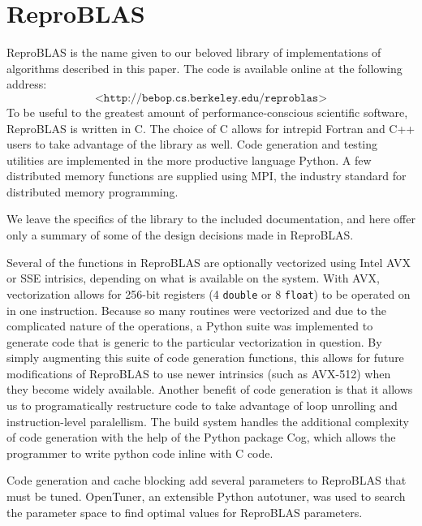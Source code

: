 \section{ReproBLAS}
  \label{sec:reproBLAS}
  ReproBLAS is the name given to our beloved library of implementations of algorithms described in this paper.
  The code is available online at the following address:
  \[
  \texttt{<http://bebop.cs.berkeley.edu/reproblas>}
  \]
  To be useful to the greatest amount of performance-conscious scientific software, ReproBLAS is written in C.
  The choice of C allows for intrepid Fortran and C++ users to take advantage of the library as well.
  Code generation and testing utilities are implemented in the more productive language Python.
  A few distributed memory functions are supplied using MPI, the industry standard for distributed memory programming.

  We leave the specifics of the library to the included documentation, and here offer only a summary of some of the design decisions made in ReproBLAS.

  Several of the functions in ReproBLAS are optionally vectorized using Intel AVX or SSE intrisics, depending on what is available on the system. With AVX, vectorization allows for 256-bit registers (4 \texttt{double} or 8 \texttt{float}) to be operated on in one instruction. Because so many routines were vectorized and due to the complicated nature of the operations, a Python suite was implemented to generate code that is generic to the particular vectorization in question. By simply augmenting this suite of code generation functions, this allows for future modifications of ReproBLAS to use newer intrinsics (such as AVX-512) when they become widely available. Another benefit of code generation is that it allows us to programatically restructure code to take advantage of loop unrolling and instruction-level paralellism. The build system handles the additional complexity of code generation with the help of the Python package Cog, which allows the programmer to write python code inline with C code.

  Code generation and cache blocking add several parameters to ReproBLAS that must be tuned. OpenTuner, an extensible Python autotuner, was used to search the parameter space to find optimal values for ReproBLAS parameters.

